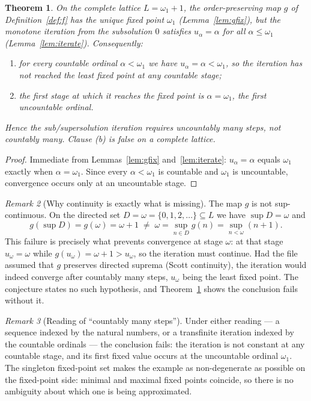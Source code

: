 \documentclass[11pt]{article}
\newtheorem{theorem}{Theorem}
\theoremstyle{definition}
\theoremstyle{remark}
\newtheorem{remark}[theorem]{Remark}
\newcommand{\Lc}{L}
\begin{document}
\begin{theorem}\label{thm:clauseB}
On the complete lattice $\Lc=\omega_1+1$, the order-preserving map $g$ of
Definition~\ref{def:f} has the unique fixed point $\omega_1$
(Lemma~\ref{lem:gfix}), but the monotone iteration from the subsolution $0$
satisfies $u_\alpha=\alpha$ for all $\alpha\le\omega_1$
(Lemma~\ref{lem:iterate}). Consequently:

\begin{enumerate}
  \item for every \emph{countable} ordinal $\alpha<\omega_1$ we have
    $u_\alpha=\alpha<\omega_1$, so the iteration has \emph{not} reached the
    least fixed point at any countable stage;
  \item the first stage at which it reaches the fixed point is
    $\alpha=\omega_1$, the first \emph{uncountable} ordinal.
\end{enumerate}

Hence the sub/supersolution iteration requires uncountably many steps, not
countably many. Clause (b) is false on a complete lattice.
\end{theorem}

\begin{proof}
Immediate from Lemmas~\ref{lem:gfix} and~\ref{lem:iterate}: $u_\alpha=\alpha$
equals $\omega_1$ exactly when $\alpha=\omega_1$. Since every $\alpha<\omega_1$
is countable and $\omega_1$ is uncountable, convergence occurs only at an
uncountable stage.
\end{proof}

\begin{remark}[Why continuity is exactly what is missing]
The map $g$ is not sup-continuous. On the directed set
$D=\omega=\{0,1,2,\dots\}\subseteq\Lc$ we have $\sup D=\omega$ and
\[
g(\sup D)=g(\omega)=\omega+1
\;\neq\;
\omega=\sup_{n\in D} g(n)=\sup_{n<\omega}(n+1).
\]
This failure is precisely what prevents convergence at stage $\omega$: at that
stage $u_\omega=\omega$ while $g(u_\omega)=\omega+1>u_\omega$, so the iteration
must continue. Had the file assumed that $g$ preserves directed suprema
(Scott continuity), the iteration would indeed converge after countably many
steps, $u_\omega$ being the least fixed point. The conjecture states no such
hypothesis, and Theorem~\ref{thm:clauseB} shows the conclusion fails without
it.
\end{remark}

\begin{remark}[Reading of ``countably many steps'']
Under either reading --- a sequence indexed by the natural numbers, or a
transfinite iteration indexed by the countable ordinals --- the conclusion
fails: the iteration is not constant at any countable stage, and its first
fixed value occurs at the uncountable ordinal $\omega_1$. The singleton
fixed-point set makes the example as non-degenerate as possible on the
fixed-point side: minimal and maximal fixed points coincide, so there is no
ambiguity about which one is being approximated.
\end{remark}
\end{document}
